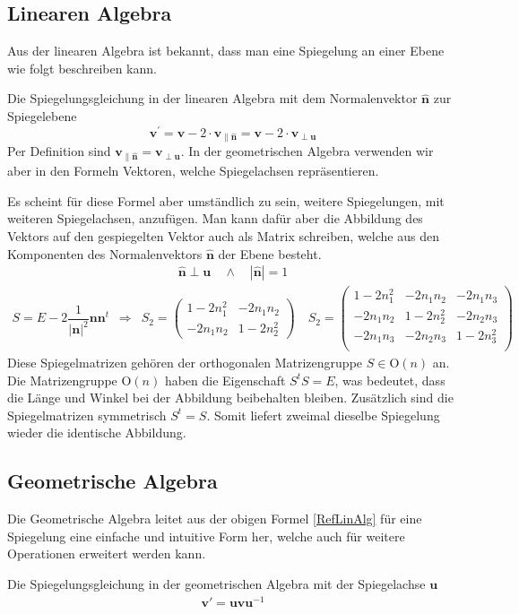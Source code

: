 \subsection{Linearen Algebra}
Aus der linearen Algebra ist bekannt, dass man eine Spiegelung an einer Ebene wie folgt beschreiben kann.
\begin{definition}
	Die Spiegelungsgleichung in der linearen Algebra mit dem Normalenvektor $\mathbf{\hat{n}}$ zur Spiegelebene
	\begin{equation} \label{RefLinAlg}
		\mathbf{v^{'}} = \mathbf{v} - 2 \cdot \mathbf{v_{\parallel \hat{n}}} = \mathbf{v} - 2 \cdot \mathbf{v_{\perp u}}
	\end{equation}
	Per Definition sind $\mathbf{v_{\parallel \hat{n}}} = \mathbf{v_{\perp u}}$. In der geometrischen Algebra verwenden wir aber in den Formeln Vektoren, welche Spiegelachsen repräsentieren.
\end{definition}
Es scheint für diese Formel aber umständlich zu sein, weitere Spiegelungen, mit weiteren Spiegelachsen, anzufügen. Man kann dafür aber die Abbildung des Vektors auf den gespiegelten Vektor auch als Matrix schreiben, welche aus den Komponenten des Normalenvektors $\mathbf{\hat{n}}$ der Ebene besteht.
\begin{align} 
	\mathbf{\hat{n}}\perp \mathbf{u}\quad \land \quad |\mathbf{\hat{n}}| = 1
\end{align}
\begin{align} \label{Spiegelmatrizen}
	S = E - 2\dfrac{1}{|\mathbf{n}|^2}\mathbf{nn}^t \enspace\Rightarrow\enspace
	S_2 = \begin{pmatrix}
		1-2n_1^2 & -2n_1n_2 \\
		-2n_1n_2 & 1-2n_2^2
	\end{pmatrix} \quad
	S_2 = \begin{pmatrix}
		1-2n_1^2 & -2n_1n_2 & -2n_1n_3\\
		-2n_1n_2 & 1-2n_2^2 & -2n_2n_3\\
		-2n_1n_3 & -2n_2n_3 & 1-2n_3^2\\
	\end{pmatrix}
\end{align}
Diese Spiegelmatrizen gehören der orthogonalen Matrizengruppe $S\in \text{O}(n)$ an. Die Matrizengruppe $\text{O}(n)$ haben die Eigenschaft $S^t S = E$, was bedeutet, dass die Länge und Winkel bei der Abbildung beibehalten bleiben. Zusätzlich sind die Spiegelmatrizen symmetrisch $S^t = S$. Somit liefert zweimal dieselbe Spiegelung wieder die identische Abbildung.
\subsection{Geometrische Algebra}
Die Geometrische Algebra leitet aus der obigen Formel \eqref{RefLinAlg} für eine Spiegelung eine einfache und intuitive Form her, welche auch für weitere Operationen erweitert werden kann.
\begin{definition}
	Die Spiegelungsgleichung in der geometrischen Algebra mit der Spiegelachse $\mathbf{u}$
	\begin{align}\label{RefGA}
		\mathbf{v}' = \mathbf{uvu}^{-1}
	\end{align}
\end{definition}

